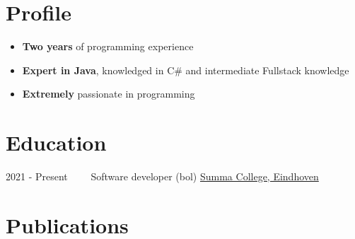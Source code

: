 \documentclass[letterpaper]{twentysecondcv} %
\begin{document}
\makesidebarFirst %

\section{Profile}

\begin{itemize}
	\item \textbf{Two years} of programming experience
	\item \textbf{Expert in Java}, knowledged in C\# and intermediate Fullstack knowledge
	\item \textbf{Extremely} passionate in programming
\end{itemize}

\vspace{6mm}


\section{Education}

\begin{twenty} %
	\twentyitem
    	{2021 - Present~~~~}
        {}
        {Software developer (bol)}
        {\href{https://www.summacollege.nl/}{Summa College, Eindhoven}}
        {}
        {}
\end{twenty}



\section{Publications}
\begin{twenty} %
\end{twenty}

\end{document}
